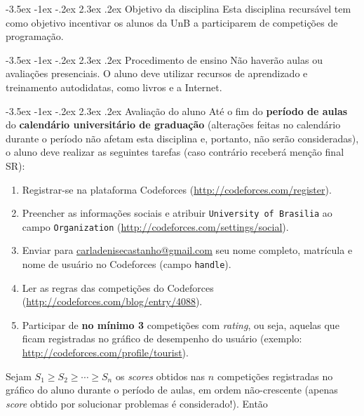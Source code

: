 \documentclass{UnBExam}%
\makeatletter
\newcommand{\numerocontests}{3}
\renewcommand\section{\@startsection{section}{1}{\z@}%
	{-3.5ex \@plus -1ex \@minus -.2ex}%
	{2.3ex \@plus.2ex}%
	{\normalfont\normalsize\bfseries}}%
\renewcommand{\indent}{\hspace{.5cm}}
\makeatother
\begin{document}
\section{Objetivo da disciplina}
\indent Esta disciplina recursável tem como objetivo incentivar os alunos da UnB a participarem de competições de programação.

\vspace{-.1cm}
\section{Procedimento de ensino}
\indent Não haverão aulas ou avaliações presenciais. O aluno deve utilizar recursos de aprendizado e treinamento autodidatas, como livros \cite{halim2013competitive,cormen2009introduction} e a Internet.

\vspace{-.1cm}
\section{Avaliação do aluno}
\indent Até o fim do \textbf{período de aulas} do \textbf{calendário universitário de graduação} (alterações feitas no calendário durante o período não afetam esta disciplina e, portanto, não serão consideradas), o aluno deve realizar as seguintes tarefas (caso contrário receberá menção final SR):
\begin{enumerate}
	\item Registrar-se na plataforma Codeforces (\url{http://codeforces.com/register}).
	\item Preencher as informações sociais e atribuir \texttt{University of Brasilia} ao campo \texttt{Organization} (\url{http://codeforces.com/settings/social}).
	\item Enviar para \url{carladenisecastanho@gmail.com} seu nome completo, matrícula e nome de usuário no Codeforces (campo \texttt{handle}).
	\item Ler as regras das competições do Codeforces (\url{http://codeforces.com/blog/entry/4088}).
	\item Participar de \textbf{no mínimo \numerocontests} competições com \textit{rating}, ou seja, aquelas que ficam registradas no gráfico de desempenho do usuário (exemplo: \url{http://codeforces.com/profile/tourist}).
\end{enumerate}
\indent Sejam $S_1 \geq S_2 \geq \cdots \geq S_n$ os \textit{scores} obtidos nas $n$ competições registradas no gráfico do aluno durante o período de aulas, em ordem não-crescente (apenas \textit{score} obtido por solucionar problemas é considerado!). Então
\end{document}
